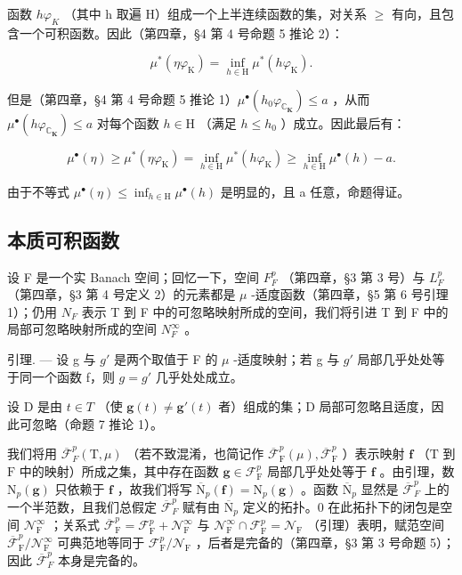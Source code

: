 函数 \(h\varphi_{K}\) （其中 h 取遍 H）组成一个上半连续函数的集，对关系 \(\geqslant\) 有向，且包含一个可积函数。因此（第四章，§4 第 4 号命题 5 推论 2）：

\[
\mu^ {*} (\eta \varphi_ {\mathrm{K}}) = \inf _ {h \in \mathrm{H}} \mu^ {*} (h \varphi_ {\mathrm{K}}).
\]

但是（第四章，§4 第 4 号命题 5 推论 1）\(\mu^{\bullet}(h_{0}\varphi_{\mathbb{C}_{\mathbf{K}}}) \leqslant a\) ，从而 \(\mu^{\bullet}(h\varphi_{\mathbb{C}_{\mathbf{K}}}) \leqslant a\) 对每个函数 \(h \in \mathrm{H}\) （满足 \(h \leqslant h_{0}\) ）成立。因此最后有：

\[
\mu^ {\bullet} (\eta) \geqslant \mu^ {*} (\eta \varphi_ {\mathrm{K}}) = \inf _ {h \in \mathrm{H}} \mu^ {*} (h \varphi_ {\mathrm{K}}) \geqslant \inf _ {h \in \mathrm{H}} \mu^ {\bullet} (h) - a.
\]

由于不等式 \(\mu^{\bullet}(\eta) \leqslant \inf_{h \in \mathrm{H}} \mu^{\bullet}(h)\) 是明显的，且 a 任意，命题得证。

\subsection{本质可积函数}

设 F 是一个实 Banach 空间；回忆一下，空间 \(F_{F}^{p}\) （第四章，§3 第 3 号）与 \(L_{F}^{p}\) （第四章，§3 第 4 号定义 2）的元素都是 \(\mu\) -适度函数（第四章，§5 第 6 号引理 1）；仍用 \(N_{F}\) 表示 T 到 F 中的可忽略映射所成的空间，我们将引进 T 到 F 中的局部可忽略映射所成的空间 \(N_{F}^{\infty}\) 。

引理. --- 设 g 与 \(g'\) 是两个取值于 F 的 \(\mu\) -适度映射；若 g 与 \(g'\) 局部几乎处处等于同一个函数 f，则 \(g = g'\) 几乎处处成立。

设 D 是由 \(t \in T\) （使 \(\mathbf{g}(t) \neq \mathbf{g}'(t)\) 者）组成的集；D 局部可忽略且适度，因此可忽略（命题 7 推论 1）。

我们将用 \(\overline{\mathcal{F}}_F^p (\mathrm{T},\mu)\) （若不致混淆，也简记作 \(\overline{\mathcal{F}}_{\mathrm{F}}^{p}(\mu),\overline{\mathcal{F}}_{\mathrm{F}}^{p}\) ）表示映射 \(\mathbf{f}\) （\(\mathrm{T}\) 到 \(\mathrm{F}\) 中的映射）所成之集，其中存在函数 \(\mathbf{g}\in \mathcal{F}_{\mathrm{F}}^{p}\) 局部几乎处处等于 \(\mathbf{f}\) 。由引理，数 \(\mathrm{N}_p(\mathbf{g})\) 只依赖于 \(\mathbf{f}\) ，故我们将写 \(\overline{\mathrm{N}}_p(\mathbf{f}) = \mathrm{N}_p(\mathbf{g})\) 。函数 \(\overline{\mathrm{N}}_p\) 显然是 \(\overline{\mathcal{F}}_F^p\) 上的一个半范数，且我们总假定 \(\overline{\mathcal{F}}_F^p\) 赋有由 \(\overline{\mathrm{N}}_p\) 定义的拓扑。0 在此拓扑下的闭包是空间 \(\mathcal{N}_{\mathrm{F}}^{\infty}\) ；关系式 \(\overline{\mathcal{F}}_{\mathrm{F}}^{p} = \mathcal{F}_{\mathrm{F}}^{p} + \mathcal{N}_{\mathrm{F}}^{\infty}\) 与 \(\mathcal{N}_{\mathrm{F}}^{\infty}\cap \mathcal{F}_{\mathrm{F}}^{p} = \mathcal{N}_{\mathrm{F}}\) （引理）表明，赋范空间 \(\overline{\mathcal{F}}_{\mathrm{F}}^{p} / \mathcal{N}_{\mathrm{F}}^{\infty}\) 可典范地等同于 \(\mathcal{F}_{\mathrm{F}}^{p} / \mathcal{N}_{\mathrm{F}}\) ，后者是完备的（第四章，§3 第 3 号命题 5）；因此 \(\overline{\mathcal{F}}_F^p\) 本身是完备的。

